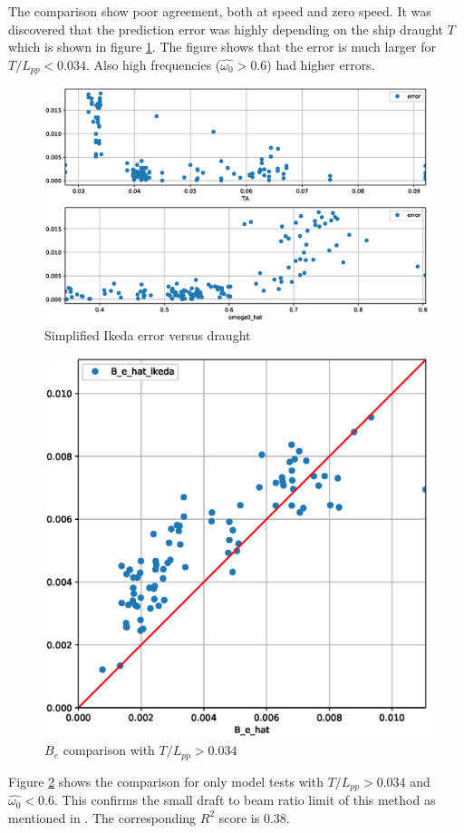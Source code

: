The comparison show poor agreement, both at speed and zero speed. It was discovered that the prediction error was highly depending on the ship draught $T$ which is shown in figure  \ref{fig:B_e_hat_error}.
The figure shows that the error is much larger for $T/L_{pp}<0.034$. Also high frequencies ($\hat{\omega_0} > 0.6$) had higher errors.

\begin{figure}[H]
    \centering
    \includegraphics[width=0.9\columnwidth]{figures/B_e_hat_error.eps}
    \caption{Simplified Ikeda error versus draught}
    \label{fig:B_e_hat_error}
\end{figure}

\begin{figure}[H]
    \centering
    \includegraphics[width=0.9\columnwidth]{figures/B_e_hat_good.eps}
    \caption{$\hat{B_e}$ comparison with $T/L_{pp}>0.034$}
    \label{fig:B_e_hat_good}
\end{figure}

Figure \ref{fig:B_e_hat_good} shows the comparison for only model tests with $T/L_{pp}>0.034$ and $\hat{\omega_0} < 0.6$.
This confirms the small draft to beam ratio limit of this method as mentioned in \parencite{kawahara_simple_2011}. The corresponding $R^2$ score is 0.38.

